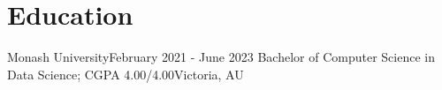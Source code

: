 \section{Education}
  \resumeSubHeadingListStart
    \resumeSubheading
      {Monash University}{February 2021 - June 2023}
      {Bachelor of Computer Science in Data Science; CGPA 4.00/4.00}{Victoria, AU}
    \resumeItemListStart
    \resumeItemListEnd
  \resumeSubHeadingListEnd
